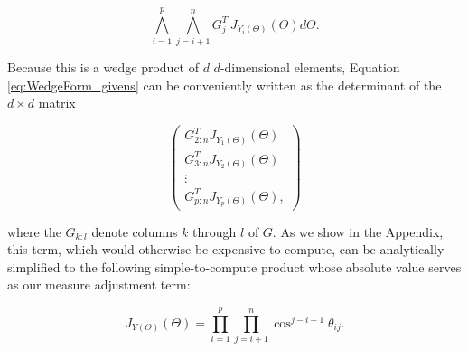\documentclass[ba]{imsart}
\numberwithin{equation}{section}
\theoremstyle{plain}
\begin{document}
\begin{equation}
\label{eq:WedgeForm_givens}
\bigwedge_{i=1}^p \bigwedge_{j=i+1}^n G_j^T\, J_{Y_i(\Theta)}(\Theta) d\Theta.
\end{equation}

\noindent Because this is a wedge product of $d$ $d$-dimensional elements, Equation \ref{eq:WedgeForm_givens} can be conveniently written as the determinant of the $d \times d$ matrix

\begin{equation}
\label{eq:measure_matrix_form}
\begin{pmatrix}
G_{2:n}^T J_{Y_1(\Theta)}(\Theta)\\
G_{3:n}^T J_{Y_2(\Theta)}(\Theta)\\
\vdots\\
G_{p:n}^T J_{Y_p(\Theta)}(\Theta),
\end{pmatrix}
\end{equation}

\noindent where the $G_{k:l}$ denote columns $k$ through $l$ of $G$. As we show in the Appendix, this term, which would otherwise be expensive to compute, can be analytically simplified to the following simple-to-compute product whose absolute value serves as our measure adjustment term:

\begin{equation}
\label{eq:final_change_of_measure}
J_{Y(\Theta)}(\Theta) = \prod_{i=1}^p \prod_{j=i+1}^n \cos^{j-i-1} \theta_{ij}.
\end{equation}

\end{document}

